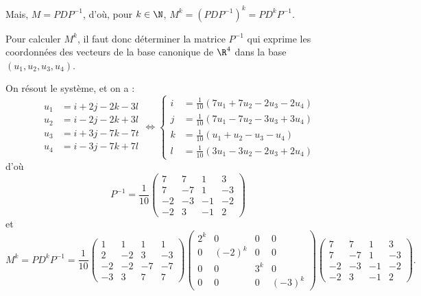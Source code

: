 {\begin{enumerate}
{Mais, $M=PDP^{-1}$, d'o\`u, pour $k\in\N$, $M^k=(PDP^{-1})^k=PD^kP^{-1}$. 

Pour calculer $M^k$, il faut donc d\'eterminer la matrice $P^{-1}$ qui exprime les coordonn\'ees des vecteurs de la base canonique de $\R^4$ dans la base $(u_1,u_2,u_3,u_4)$.

On r\'esout le syst\`eme, et on a :
$$\begin{align*}u_1&=i+2j-2k-3l \\  u_2&=i-2j-2k+3l \\  u_3&=i+3j-7k-7t \\  u_4&=i-3j-7k+7l\end{align*}\iff
\left\{\begin{align*}i&={\frac{1}{10}}(7u_1+7u_2-2u_3-2u_4) \\  
j&={\frac{1}{10}}(7u_1-7u_2-3u_3+3u_4) \\  
k&={\frac{1}{10}}(u_1+u_2-u_3-u_4) \\  
l&={\frac{1}{10}}(3u_1-3u_2-2u_3+2u_4)\end{align*}\right.$$
d'o\`u
$$P^{-1}={\frac{1}{10}}\begin{pmatrix}7&7&1&3 \\  7&-7&1&-3 \\  -2&-3&-1&-2 \\  -2&3&-1&2\end{pmatrix}$$
et 
$$M^k=PD^kP^{-1}={\frac{1}{10}}\begin{pmatrix}1&1&1&1 \\  2&-2&3&-3 \\  -2&-2&-7&-7 \\  -3&3&7&7\end{pmatrix}
\begin{pmatrix}2^k&0&0&0 \\  0&(-2)^k&0&0 \\  0&0&3^k&0 \\  0&0&0&(-3)^k\end{pmatrix}
\begin{pmatrix}7&7&1&3 \\  7&-7&1&-3 \\  -2&-3&-1&-2 \\  -2&3&-1&2\end{pmatrix}.$$}
\end{enumerate}
}